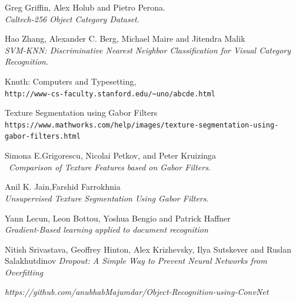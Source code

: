 \documentclass{article} %
\begin{document}
\begin{thebibliography}{9}

Greg Griffin, Alex Holub and Pietro Perona. \\
\textit{Caltech-256 Object Category Dataset}. 
 
Hao Zhang, Alexander C. Berg, Michael Maire and Jitendra Malik \\
\textit{SVM-KNN: Discriminative Nearest Neighbor Classification for Visual Category
Recognition}.
 
Knuth: Computers and Typesetting,
\\\texttt{http://www-cs-faculty.stanford.edu/\~{}uno/abcde.html}

Texture Segmentation using Gabor Filters
\\\texttt{https://www.mathworks.com/help/images/texture-segmentation-using-gabor-filters.html}

Simona E.Grigorescu, Nicolai Petkov, and Peter Kruizinga\\\
\textit{Comparison of Texture Features based on Gabor Filters}. 

Anil K. Jain,Farshid Farrokhnia
\\
\textit{Unsupervised Texture Segmentation Using Gabor
Filters}. 

Yann Lecun, Leon Bottou, Yoshua Bengio and Patrick Haffner \\
\textit{Gradient-Based learning applied to document recognition}

Nitish Srivastava,
Geoffrey Hinton,
Alex Krizhevsky,
Ilya Sutskever and
Ruslan Salakhutdinov 
\textit{Dropout: A Simple Way to Prevent Neural Networks from Overfitting}

\textit{https://github.com/anubhabMajumdar/Object-Recognition-using-ConvNet}

\end{thebibliography}
\end{document}
